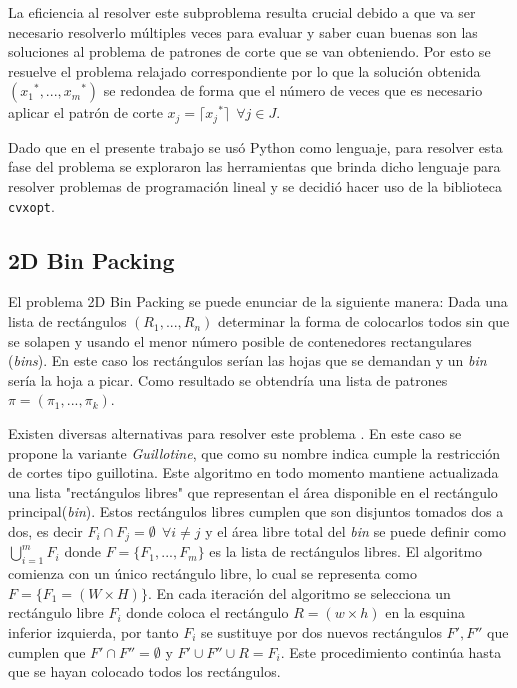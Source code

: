 \documentclass[a4paper,10pt,twocolumn]{article}
\begin{document}
La eficiencia al resolver este subproblema resulta crucial debido a que va ser necesario resolverlo múltiples veces para evaluar y saber cuan buenas son las soluciones al problema de patrones de corte que se van obteniendo. Por esto se resuelve el problema relajado correspondiente por lo que la solución obtenida $({x_1}^*,...,{x_m}^*)$ se redondea de forma que el número de veces que es necesario aplicar el patrón de corte $x_j = \lceil {x_j}^* \rceil \ \ \forall j \in J$.

Dado que en el presente trabajo se usó Python como lenguaje, para resolver esta fase del problema se exploraron las herramientas que brinda dicho lenguaje para resolver problemas de programación lineal y se decidió hacer uso de la biblioteca \texttt{cvxopt}.

\subsection{2D Bin Packing}
El problema 2D Bin Packing se puede enunciar de la siguiente manera: Dada una lista de rectángulos $(R_1,...,R_n)$ determinar la forma de colocarlos todos sin que se solapen y usando el menor número posible de contenedores rectangulares (\textit{bins}). En este caso los rectángulos serían las hojas que se demandan y un \textit{bin} sería la hoja a picar. Como resultado se obtendría una lista de patrones $\pi = (\pi_1,...,\pi_k)$.

Existen diversas alternativas para resolver este problema \cite{11}. En este caso se propone la variante \textit{Guillotine}, que como su nombre indica cumple la restricción de cortes tipo guillotina. Este algoritmo en todo momento mantiene actualizada una lista "rectángulos libres" que representan el área disponible en el rectángulo principal(\textit{bin}). Estos rectángulos libres cumplen que son disjuntos tomados dos a dos, es decir $F_i \cap F_j = \emptyset \ \ \forall i\neq j $ y el área libre total del \textit{bin} se puede definir como $\bigcup\limits_{i=1}^{m} F_{i}$ donde $F = \{F_1,...,F_m\}$ es la lista de rectángulos libres. El algoritmo comienza con un único rectángulo libre, lo cual se representa como $F = \{F_1 = (W \times H)\}$. En cada iteración del algoritmo se selecciona un rectángulo libre $F_i$ donde coloca el rectángulo $R = (w \times h)$ en la esquina inferior izquierda, por tanto $F_i$ se sustituye por dos nuevos rectángulos $F',F''$ que cumplen que $F' \cap F'' = \emptyset$ y $F' \cup F'' \cup R = F_i$. Este procedimiento continúa hasta que se hayan colocado todos los rectángulos.
\end{document}
